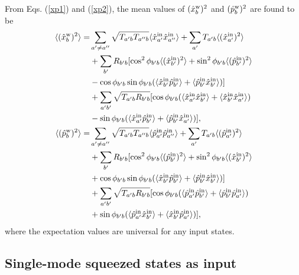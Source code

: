 \documentclass[9pt,twocolumn,twoside]{osajnl}
\begin{document}
From Eqs. (\ref{xp1}) and (\ref{xp2}), the mean values of $(\hat{x}_b^{\rm{w}})^2$ and $(\hat{p}_b^{\rm{w}})^2$ are found to be
\begin{align}
\label{var2b}
\langle (\hat{x}_b^{\rm{w}})^2 \rangle  =&  \sum_{a'\neq a''}  \sqrt{T_{a'b} T_{a''b}}   \langle\hat{x}_{a'}^{\rm{in}} \hat{x}_{a''}^{\rm{in}}\rangle + \sum_{a'} {T_{a'b} \langle(\hat{x}_{a'}^{\rm{in}})^2 \rangle }\\ \nonumber
& +  \sum_{b'} R_{b'b}  [\cos^2 \phi_{b'b}  \langle(\hat{x}_{b'}^{\rm{in}})^2\rangle  + \sin^2 \phi_{b'b}  \langle(\hat{p}_{b'}^{\rm{in}})^2\rangle  \\ \nonumber
&- \cos \phi_{b'b} \sin \phi_{b'b} ( \langle\hat{x}_{b'}^{\rm{in}} \hat{p}_{b'}^{\rm{in}}\rangle +  \langle\hat{p}_{b'}^{\rm{in}} \hat{x}_{b'}^{\rm{in}}\rangle )  ] \\ \nonumber
&+ \sum_{a' b'}\sqrt{T_{a'b} R_{b'b}} [\cos \phi_{b'b} (\langle\hat{x}_{a'}^{\rm{in}} \hat{x}_{b'}^{\rm{in}}\rangle + \langle\hat{x}_{b'}^{\rm{in}} \hat{x}_{a'}^{\rm{in}}\rangle) \\ \nonumber
&- \sin \phi_{b'b} (\langle\hat{x}_{a'}^{\rm{in}} \hat{p}_{b'}^{\rm{in}}\rangle + \langle\hat{p}_{b'}^{\rm{in}} \hat{x}_{a'}^{\rm{in}}\rangle)]  ,\\ \nonumber
\langle (\hat{p}_b^{\rm{w}})^2 \rangle  =& \sum_{a'\neq a''}  \sqrt{T_{a'b} T_{a''b}}   \langle\hat{p}_{a'}^{\rm{in}} \hat{p}_{a''}^{\rm{in}}\rangle +  \sum_{a'} {T_{a'b} \langle(\hat{p}_{a'}^{\rm{in}})^2 \rangle }\\ \nonumber
& +  \sum_{b'} R_{b'b} [ \cos^2 \phi_{b'b}  \langle(\hat{p}_{b'}^{\rm{in}})^2\rangle  + \sin^2 \phi_{b'b}  \langle(\hat{x}_{b'}^{\rm{in}})^2\rangle \\ \nonumber
& + \cos \phi_{b'b} \sin \phi_{b'b} ( \langle\hat{x}_{b'}^{\rm{in}} \hat{p}_{b'}^{\rm{in}}\rangle +  \langle\hat{p}_{b'}^{\rm{in}} \hat{x}_{b'}^{\rm{in}}\rangle ) ]  \\ \nonumber
&+ \sum_{a' b'}\sqrt{T_{a'b} R_{b'b}} [\cos \phi_{b'b} (\langle\hat{p}_{a'}^{\rm{in}} \hat{p}_{b'}^{\rm{in}}\rangle + \langle\hat{p}_{b'}^{\rm{in}} \hat{p}_{a'}^{\rm{in}}\rangle) \\ \nonumber
&+ \sin \phi_{b'b} (\langle\hat{p}_{a'}^{\rm{in}} \hat{x}_{b'}^{\rm{in}}\rangle + \langle\hat{x}_{b'}^{\rm{in}} \hat{p}_{a'}^{\rm{in}}\rangle)] ,
\end{align}
where the expectation values are universal for any input states. 


\subsection{Single-mode squeezed states as input}
\end{document}
